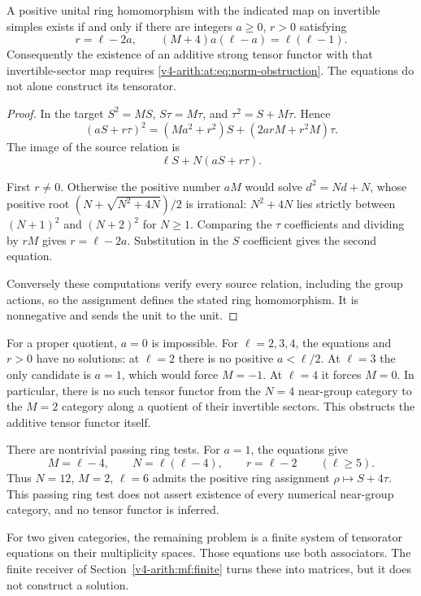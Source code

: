 \begin{theorem}\label{v4-arith:at:thm:norm-obstruction}

A positive unital ring homomorphism with the indicated map on invertible simples exists if and
only if there are integers $a\ge0$, $r>0$ satisfying
\begin{equation}\label{v4-arith:at:eq:norm-obstruction}
 r=\ell-2a,\qquad (M+4)a(\ell-a)=\ell(\ell-1).
\end{equation}
Consequently the existence of an additive strong tensor functor with that invertible-sector map
requires \eqref{v4-arith:at:eq:norm-obstruction}. The equations do not alone construct its tensorator.
\end{theorem}
\begin{proof}
In the target $S^2=MS$, $S\tau=M\tau$, and $\tau^2=S+M\tau$. Hence
\[
 (aS+r\tau)^2=(Ma^2+r^2)S+(2arM+r^2M)\tau.
\]
The image of the source relation is
\[
 \ell S+N(aS+r\tau).
\]

First $r\ne0$. Otherwise the positive number $aM$ would solve $d^2=Nd+N$, whose positive root
$(N+\sqrt{N^2+4N})/2$ is irrational: $N^2+4N$ lies strictly between $(N+1)^2$ and $(N+2)^2$ for
$N\ge1$. Comparing the $\tau$ coefficients and dividing by $rM$ gives $r=\ell-2a$. Substitution
in
the $S$ coefficient gives the second equation.

Conversely these computations verify every source
relation, including the group actions, so the assignment defines the stated ring homomorphism.
It is nonnegative and sends the unit to the unit.
\end{proof}

For a proper quotient, $a=0$ is impossible. For $\ell=2,3,4$, the equations and $r>0$ have no
solutions: at $\ell=2$ there is no positive $a<\ell/2$. At $\ell=3$ the only candidate is $a=1$,
which
would force $M=-1$. At $\ell=4$ it forces $M=0$. In particular, there is no such tensor functor
from the $N=4$ near-group category to the $M=2$ category along a quotient of their invertible
sectors. This obstructs the additive tensor functor itself.

There are nontrivial passing ring tests. For $a=1$, the equations give
\[
 M=\ell-4,\qquad N=\ell(\ell-4),\qquad r=\ell-2\qquad(\ell\ge5).
\]
Thus $N=12$, $M=2$, $\ell=6$ admits the positive ring assignment $\rho\mapsto S+4\tau$. This
passing ring test does not assert existence of every numerical near-group category, and no
tensor functor is inferred.

For two given categories, the remaining problem is a finite system
of tensorator equations on their multiplicity spaces. Those equations use both associators. The
finite receiver of Section~\ref{v4-arith:mf:finite} turns these into matrices, but
it does not construct a solution.


